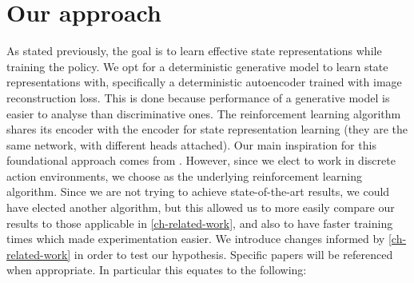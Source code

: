 \section{Our approach}
As stated previously, the goal is to learn effective state representations
while training the policy.
We opt for a deterministic generative model to learn state representations with,
specifically a deterministic autoencoder trained with image reconstruction loss.
This is done because performance of a generative model is easier to analyse than discriminative ones.
The reinforcement learning algorithm shares its encoder with the encoder 
for state representation learning (they are the same network, with different heads attached).
Our main inspiration for this foundational approach comes from \cite{sac+ae}.
However, since we elect to work in discrete action environments, we choose \cite{rainbow}
as the underlying reinforcement learning algorithm.
Since we are not trying to achieve state-of-the-art results, we could have elected
another algorithm, but this allowed us to more easily compare our results
to those applicable in \ref{ch-related-work}, and also to have faster training times
which made experimentation easier.
We introduce changes informed by \ref{ch-related-work} in order to test our hypothesis.
Specific papers will be referenced when appropriate.
In particular this equates to the following:

